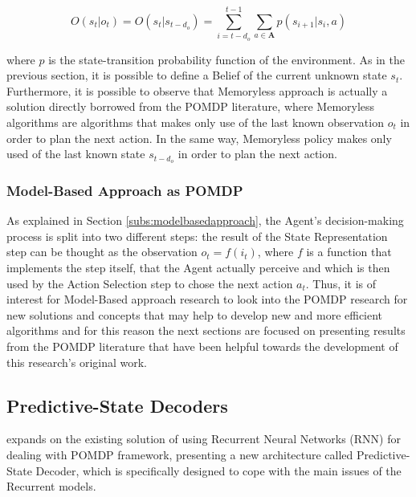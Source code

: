                 \[ O(s_t|o_t) = O(s_t|s_{t-d_o}) = \sum_{i = t - d_o}^{t-1} \sum_{a \in \mathbf{A}} p(s_{i+1}|s_{i}, a)\]
                
                where $p$ is the state-transition probability function of the environment. As in the previous section, it is possible to define a Belief of the current unknown state $s_t$. \newline
                Furthermore, it is possible to observe that Memoryless approach is actually a solution directly borrowed from the POMDP literature, where Memoryless algorithms are algorithms that makes only use of the last known observation $o_t$ in order to plan the next action. In the same way, Memoryless policy makes only used of the last known state $s_{t-d_o}$ in order to plan the next action.
            
            \subsubsection{Model-Based Approach as POMDP}
                As explained in Section \ref{subs:modelbasedapproach}, the Agent's decision-making process is split into two different steps: the result of the State Representation step can be thought as the observation $o_t = f (i_t)$, where $f$ is a function that implements the step itself, that the Agent actually perceive and which is then used by the Action Selection step to chose the next action $a_t$. \newline
                Thus, it is of interest for Model-Based approach research to look into the POMDP research for new solutions and concepts that may help to develop new and more efficient algorithms and for this reason the next sections are focused on presenting results from the POMDP literature that have been helpful towards the development of this research's original work.
                
                
                
        \newpage
        \subsection{Predictive-State Decoders}
            \label{subs:psd}
             expands on the existing solution of using Recurrent Neural Networks (RNN) for dealing with POMDP framework, presenting a new architecture called Predictive-State Decoder, which is specifically designed to cope with the main issues of the Recurrent models. 
            
